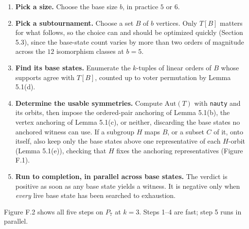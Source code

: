 \documentclass[
]{article}
\providecommand{\tightlist}{%
  \setlength{\itemsep}{0pt}\setlength{\parskip}{0pt}}
\begin{document}
\begin{enumerate}
\def\labelenumi{\arabic{enumi}.}
\tightlist
\item
  \textbf{Pick a size.} Choose the base size \(b\), in practice \(5\) or
  \(6\).
\item
  \textbf{Pick a subtournament.} Choose a set \(B\) of \(b\) vertices.
  Only \(T[B]\) matters for what follows, so the choice can and should
  be optimized quickly (Section 5.3), since the base-state count varies
  by more than two orders of magnitude across the \(12\) isomorphism
  classes at \(b = 5\).
\item
  \textbf{Find its base states.} Enumerate the \(k\)-tuples of linear
  orders of \(B\) whose supports agree with \(T[B]\), counted up to
  voter permutation by Lemma 5.1(d).
\item
  \textbf{Determine the usable symmetries.} Compute \(\mathrm{Aut}(T)\)
  with \texttt{nauty} and its orbits, then impose the ordered-pair
  anchoring of Lemma 5.1(b), the vertex anchoring of Lemma 5.1(c), or
  neither, discarding the base states no anchored witness can use. If a
  subgroup \(H\) maps \(B\), or a subset \(C\) of it, onto itself, also
  keep only the base states above one representative of each \(H\)-orbit
  (Lemma 5.1(e)), checking that \(H\) fixes the anchoring
  representatives (Figure F.1).
\item
  \textbf{Run to completion, in parallel across base states.} The
  verdict is positive as soon as any base state yields a witness. It is
  negative only when \emph{every} live base state has been searched to
  exhaustion.
\end{enumerate}

Figure F.2 shows all five steps on \(P_7\) at \(k = 3\). Steps 1--4 are
fast; step 5 runs in parallel.
\end{document}
